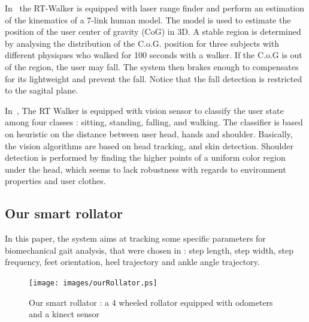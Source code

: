 \documentclass[letterpaper, 10 pt, conference]{ieeeconf}
\begin{document}
In~\cite{Hirata2008a} the RT-Walker is equipped with laser range finder and perform an estimation of the kinematics of a 7-link human model. The model is used to estimate the position of the user center of gravity (CoG) in 3D. A stable region is determined by analysing the distribution of the C.o.G. position for three subjects with different physiques who walked for 100 seconds with a walker. If the C.o.G is out of the region, the user may fall. The system then brakes enough to compensates for its lightweight and prevent the fall. Notice that the fall detection is restricted to the sagital plane.

In~\cite{Taghvaei10}, The RT Walker is equipped with vision sensor to classify the user state among four classes : sitting, standing, falling, and walking. The classifier is based on heuristic on the distance between user head, hands and shoulder. Basically, the vision algorithms are based on head tracking, and skin detection. Shoulder detection is performed by finding the higher points of a uniform color region under the head, which seems to lack robustness with regards to environment properties and user clothes.   


\subsection{Our smart rollator}

In this paper, the system aims at tracking some specific parameters for biomechanical gait analysis, that were chosen in \cite{Dune12} : step length, step width, step frequency, feet orientation, heel trajectory and ankle angle trajectory.

\begin{figure}[h]
	\centering
	\texttt{[image: images/ourRollator.ps]}
	\caption{Our smart rollator : a 4 wheeled rollator equipped with odometers and a kinect sensor}
	\label{fig:ourrollator}
\end{figure}
\end{document}
